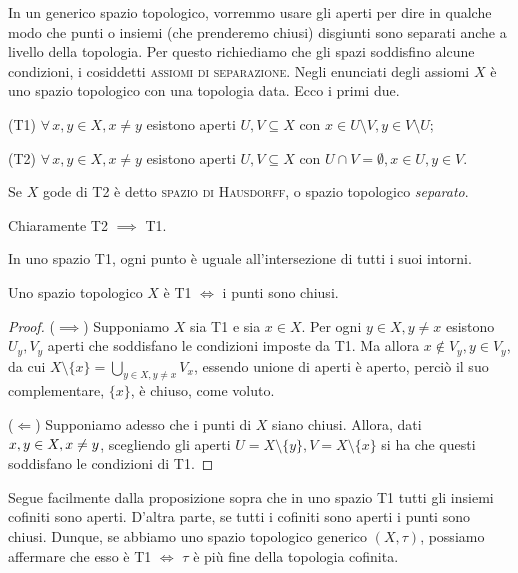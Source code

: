 In un generico spazio topologico, vorremmo usare gli aperti per dire in qualche modo che punti o insiemi (che prenderemo chiusi) disgiunti sono separati anche a livello della topologia. Per questo richiediamo che gli spazi soddisfino alcune condizioni, i cosiddetti \textsc{assiomi di separazione}. Negli enunciati degli assiomi $X$ è uno spazio topologico con una topologia data. Ecco i primi due.

(T1) $\forall \, x, y \in X, x \not=y$ esistono aperti $U, V \subseteq X$ con $x \in U \setminus V, y \in V \setminus U$;

(T2) $\forall \, x, y \in X, x \not=y$ esistono aperti $U, V \subseteq X$ con $U \cap V= \emptyset, x \in U, y \in V$.

\begin{defn} Se $X$ gode di T2 è detto \textsc{spazio di Hausdorff}, o spazio topologico \textit{separato}.
\end{defn}

Chiaramente T2 $\implies$ T1.

\begin{oss}
  In uno spazio T1, ogni punto è uguale all'intersezione di tutti i suoi intorni.
\end{oss}

\begin{prop}
  Uno spazio topologico $X$ è T1 $\Leftrightarrow$ i punti sono chiusi.
\end{prop}

\begin{proof}
  ($\implies$) Supponiamo $X$ sia T1 e sia $x \in X$. Per ogni $y \in X, y \not=x$ esistono $U_y, V_y$ aperti che soddisfano le condizioni imposte da T1. Ma allora $x \not \in V_y, y \in V_y$, da cui $\displaystyle X \setminus \{x\}=\bigcup_{y \in X, y \not=x} V_x$, essendo unione di aperti è aperto, perciò il suo complementare, $\{x\}$, è chiuso, come voluto.

  ($\Leftarrow$) Supponiamo adesso che i punti di $X$ siano chiusi. Allora, dati $x, y \in X, \\ x \not= y$, scegliendo gli aperti $U=X \setminus \{y\}, V=X \setminus \{x\}$ si ha che questi soddisfano le condizioni di T1.
\end{proof}

\begin{oss}
  Segue facilmente dalla proposizione sopra che in uno spazio T1 tutti gli insiemi cofiniti sono aperti. D'altra parte, se tutti i cofiniti sono aperti i punti sono chiusi. Dunque, se abbiamo uno spazio topologico generico $(X, \tau)$, possiamo affermare che esso è T1 $\Leftrightarrow$ $\tau$ è più fine della topologia cofinita.
\end{oss}

